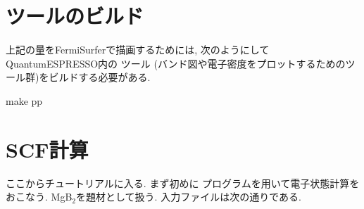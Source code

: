 \documentclass[letterpaper,10pt,dvipdfmx,openany]{sphinxmanual}
\begin{document}
\section{ ツールのビルド}
\label{\detokenize{qe:postprocess}}
\sphinxAtStartPar
上記の量をFermiSurferで描画するためには, 次のようにしてQuantumESPRESSO内の  ツール
(バンド図や電子密度をプロットするためのツール群)をビルドする必要がある.

\begin{sphinxVerbatim}[commandchars=\\\{\}]
\PYGZdl{} make pp
\end{sphinxVerbatim}


\section{SCF計算}
\label{\detokenize{qe:scf}}
\sphinxAtStartPar
ここからチュートリアルに入る.
まず初めに  プログラムを用いて電子状態計算をおこなう.
MgB$_{\text{2}}$を題材として扱う.
入力ファイルは次の通りである.

\sphinxAtStartPar
{}
\end{document}
